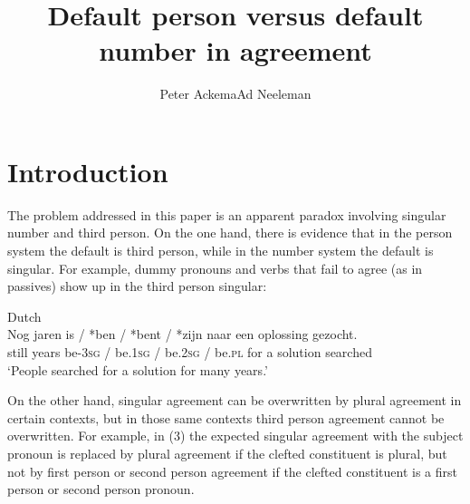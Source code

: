 \documentclass[output=paper]{langsci/langscibook}
\title{Default person versus default number in agreement}
\author{Peter Ackema\affiliation{University of Edinburgh}\lastand Ad Neeleman\affiliation{UCL}}
\begin{document}
 

 

 

 

 

\section{Introduction}

The problem addressed in this paper is an apparent paradox involving singular number and third person. On the one hand, there is evidence that in the person system the default is third person, while in the number system the default is singular. For example, dummy pronouns and verbs that fail to agree (as in  passives) show up in the third person singular:

\ea 
  \z
\z

\ea Dutch \\
\gll Nog  jaren  is / *ben / *bent / *zijn              naar een oplossing gezocht.\\
  still years  be-\textsc{3sg} / be.\textsc{1sg} / be.\textsc{2sg} / be.\textsc{pl} for   a    solution   searched\\
\glt ‘People searched for a solution for many years.’
\z

On the other hand, singular agreement can be overwritten by plural agreement in certain contexts, but in those same contexts third person agreement cannot be overwritten. For example, in (3) the expected singular agreement with the subject pronoun is replaced by plural agreement if the clefted constituent is plural, but not by first person or second person agreement if the clefted constituent is a first person or second person pronoun.
\end{document}
